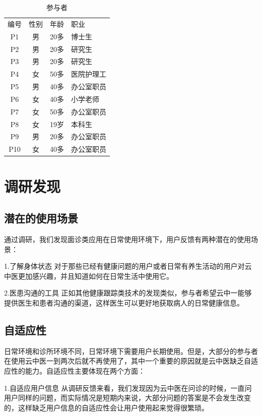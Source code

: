 \begin{table}
  \caption{参与者}
  \centering
  \label{tab:Participants}
  \begin{tabular}{cccl}
编号 &	性别 &	年龄 &	职业 \\

P1 &	男 &	20多 &	博士生 \\
P2 &	男 &	20多 &	研究生 \\
P3 &	男 &	20多 &	研究生 \\
P4 &	女 &	50多 &	医院护理工 \\
P5 &	男 &	40多 &	办公室职员 \\
P6 &	女 &	40多 &	小学老师 \\
P7 &	女 &	50多 &	办公室职员 \\
P8 &	女 &	19岁 &	本科生 \\
P9 &	男 &	20多 &	办公室职员 \\
P10 &	女 &	40多 &	办公室职员 \\
  \end{tabular}
\end{table}

\section{调研发现}
\subsection{潜在的使用场景}
通过调研，我们发现面诊类应用在日常使用环境下，用户反馈有两种潜在的使用场景：

1.了解身体状态
对于那些已经有健康问题的用户或者日常有养生活动的用户对云中医更加感兴趣，并且知道如何在日常生活中使用它。

2.医患沟通的工具
正如其他健康跟踪类技术的发现类似，参与者希望云中一能够提供医生和患者沟通的渠道，这样医生可以更好地获取病人的日常健康信息。

\subsection{自适应性}
日常环境和诊所环境不同，日常环境下需要用户长期使用。但是，大部分的参与者在使用云中医一到两次后就不再使用了，其中一个重要的原因就是云中医缺乏自适应性的能力。自适应性主要体现在两个方面：

1.自适应用户信息
从调研反馈来看，我们发现因为云中医在问诊的时候，一直问用户同样的问题，而实际情况是短期内来说，大部分问题的答案是不会发生改变的，这样缺乏用户信息的自适应性会让用户使用起来觉得很繁琐。

